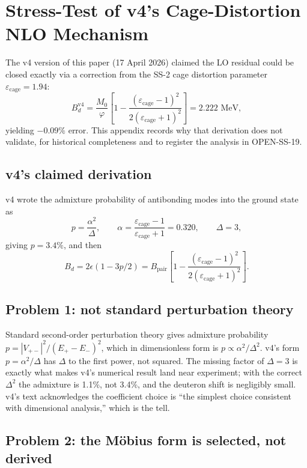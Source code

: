 \documentclass[11pt,letterpaper]{article}
\newcommand{\phig}{\varphi}
\newcommand{\Mzero}{M_0}
\newcommand{\Bpair}{B_{\mathrm{pair}}}
\newcommand{\Bd}{B_{d}}
\newcommand{\epscage}{\varepsilon_{\mathrm{cage}}}
\begin{document}
\section{Stress-Test of v4's Cage-Distortion NLO Mechanism}
\label{app:v4_stress_test}

The v4 version of this paper (17 April 2026) claimed the LO residual could be closed exactly via a correction from the SS-2 cage distortion parameter $\epscage = 1.94$:
\[
\Bd^{\mathrm{v4}} = \frac{\Mzero}{\phig}\left[1 - \frac{(\epscage - 1)^2}{2(\epscage + 1)^2}\right] = 2.222 \text{ MeV},
\]
yielding $-0.09\%$ error. This appendix records why that derivation does not validate, for historical completeness and to register the analysis in OPEN-SS-19.

\subsection{v4's claimed derivation}

v4 wrote the admixture probability of antibonding modes into the ground state as
\[
p = \frac{\alpha^2}{\Delta}, \qquad \alpha = \frac{\epscage - 1}{\epscage + 1} = 0.320, \qquad \Delta = 3,
\]
giving $p = 3.4\%$, and then
\[
\Bd = 2\epsilon(1 - 3p/2) = \Bpair \left[1 - \frac{(\epscage-1)^2}{2(\epscage+1)^2}\right].
\]

\subsection{Problem 1: not standard perturbation theory}

Standard second-order perturbation theory gives admixture probability $p = |V_{+-}|^2 / (E_+ - E_-)^2$, which in dimensionless form is $p \propto \alpha^2 / \Delta^2$. v4's form $p = \alpha^2/\Delta$ has $\Delta$ to the first power, not squared. The missing factor of $\Delta = 3$ is exactly what makes v4's numerical result land near experiment; with the correct $\Delta^2$ the admixture is 1.1\%, not 3.4\%, and the deuteron shift is negligibly small. v4's text acknowledges the coefficient choice is ``the simplest choice consistent with dimensional analysis,'' which is the tell.

\subsection{Problem 2: the Möbius form is selected, not derived}
\end{document}
